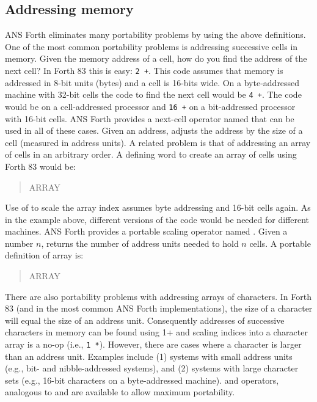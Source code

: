 \subsection{Addressing memory} %

ANS Forth eliminates many portability problems by using the above
definitions. One of the most common portability problems is addressing
successive cells in memory. Given the memory address of a cell, how
do you find the address of the next cell? In Forth 83 this is easy:
\texttt{2 +}. This code assumes that memory is addressed in 8-bit
units (bytes) and a cell is 16-bits wide. On a byte-addressed machine
with 32-bit cells the code to find the next cell would be \texttt{4 +}.
The code would be  on a cell-addressed processor and
\texttt{16 +} on a bit-addressed processor with 16-bit cells. ANS Forth
provides a next-cell operator named  that can be used in
all of these cases. Given an address,  adjusts the address
by the size of a cell (measured in address units). A related problem
is that of addressing an array of cells in an arbitrary order. A
defining word to create an array of cells using Forth 83 would be:
\begin{quote}\ttfamily
	\word{:} ARRAY ~  ~   ~
		   \word{+} \word{;}
\end{quote}
Use of  to scale the array index assumes byte addressing and
16-bit cells again. As in the example above, different versions of
the code would be needed for different machines. ANS Forth provides
a portable scaling operator named . Given a number $n$,
 returns the number of address units needed to hold $n$
cells. A portable definition of array is:
\begin{quote}\ttfamily
	\word{:} ARRAY ~  ~   \\
	\hspace*{2em}   \word{+} \word{;}
\end{quote}
There are also portability problems with addressing arrays of
characters. In Forth 83 (and in the most common ANS Forth
implementations), the size of a character will equal the size of an
address unit. Consequently addresses of successive characters in
memory can be found using 1+ and scaling indices into a character
array is a no-op (i.e., \texttt{1 *}). However, there are cases where
a character is larger than an address unit. Examples include (1)
systems with small address units (e.g., bit- and nibble-addressed
systems), and (2) systems with large character sets (e.g., 16-bit
characters on a byte-addressed machine).  and 
operators, analogous to  and  are available
to allow maximum portability.

